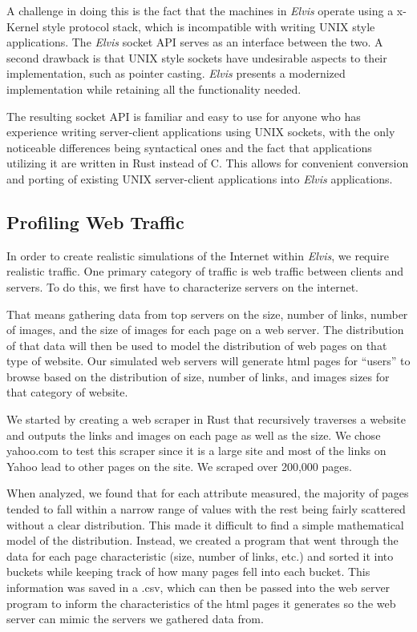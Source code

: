 \documentclass[journal]{IEEEtran} %
\newcommand{\elvis}{\textit{Elvis}}
\begin{document}
A challenge in doing this is the fact that the machines in \elvis{} operate using a x-Kernel style protocol stack, which is incompatible with writing UNIX style applications.
The \elvis{} socket API serves as an interface between the two. 
A second drawback is that UNIX style sockets have undesirable aspects to their implementation, such as  pointer casting. 
\elvis{} presents a modernized  implementation while retaining all the functionality needed.

The resulting socket API is familiar and easy to use for anyone who has experience writing server-client applications using UNIX sockets, with the only noticeable differences being syntactical ones and the fact that applications utilizing it are written in Rust instead of C. This allows for convenient conversion and porting of existing UNIX server-client applications into \elvis{} applications.


\subsection{Profiling Web Traffic}

In order to create realistic simulations of the Internet within \elvis{}, we require realistic traffic. One primary category of traffic is web traffic between clients and servers.  To do this, we first have to characterize servers on the internet.

That means gathering data from top servers on the size, number of links, number of images, and the size of images for each page on a web server. The distribution of that  data will then be used to model the distribution of web pages on that type of website. Our simulated web servers will generate html pages for “users” to browse based on the distribution of size, number of links, and images sizes for that category of website. 

We started by creating a web scraper in Rust that recursively traverses a website and outputs the links and images on each page as well as the size. We chose yahoo.com to test this scraper since it is a large site and most of the links on Yahoo lead to other pages on the site. We scraped over 200,000 pages.  

When analyzed, we found that for each attribute measured, the majority of pages tended to fall within a narrow range of values with the rest being fairly scattered without a clear distribution. This made it difficult to find a simple mathematical model of the distribution. Instead, we created a program that went through the data for each page characteristic (size, number of links, etc.) and sorted it into buckets while keeping track of how many pages fell into each bucket. This information was saved in a .csv, which can then be passed into the web server program to inform the characteristics of the html pages it generates so the web server can mimic the servers we gathered data from.
\end{document}
